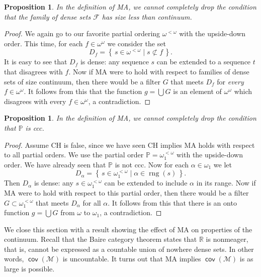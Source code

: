\documentclass[11pt,oneside,a4paper]{amsbook}
\newcommand{\set}[1]{\left\{\,#1\,\right\}}
\newcommand{\R}{\mathbb R}
\newcommand{\PP}{\mathbb P}
\newcommand{\Meager}{\mathcal M}
\DeclareMathOperator{\rng}{rng}
\DeclareMathOperator{\cov}{\mathsf{cov}}
\theoremstyle{definition}
\theoremstyle{plain}
\newtheorem{proposition}[theorem]{Proposition}
\theoremstyle{definition}
\theoremstyle{remark}
\numberwithin{equation}{section}
\numberwithin{figure}{section}
\begin{document}
\begin{proposition}
  In the definition of MA, we cannot completely drop the condition that the family of dense sets $\mathcal F$ has size less than continuum.
\end{proposition}

\begin{proof}
  We again go to our favorite partial ordering $\omega^{<\omega}$ with the upside-down order. This time, for each $f\in\omega^\omega$ we consider the set
  \[D_f=\set{s\in\omega^{<\omega}\mid s\not\subset f}\text{.}
  \]
  It is easy to see that $D_f$ is dense: any sequence $s$ can be extended to a sequence $t$ that disagrees with $f$. Now if MA were to hold with respect to families of dense sets of size continuum, then there would be a filter $G$ that meets $D_f$ for \emph{every} $f\in\omega^\omega$. It follows from this that the function $g=\bigcup G$ is an element of $\omega^\omega$ which disagrees with every $f\in\omega^\omega$, a contradiction.
\end{proof}

\begin{proposition}
  In the definition of MA, we cannot completely drop the condition that $\PP$ is ccc.
\end{proposition}

\begin{proof}
  Assume CH is false, since we have seen CH implies MA holds with respect to all partial orders. We use the partial order $\PP=\omega_1^{<\omega}$ with the upside-down order. We have already seen that $\PP$ is not ccc. Now for each $\alpha\in\omega_1$ we let
  \[D_\alpha=\set{s\in\omega_1^{<\omega}\mid\alpha\in\rng(s)}\text{.}
  \]
  Then $D_\alpha$ is dense: any $s\in\omega_1^{<\omega}$ can be extended to include $\alpha$ in its range. Now if MA were to hold with respect to this partial order, then there would be a filter $G\subset\omega_1^{<\omega}$ that meets $D_\alpha$ for all $\alpha$. It follows from this that there is an onto function $g=\bigcup G$ from $\omega$ to $\omega_1$, a contradiction.
\end{proof}

We close this section with a result showing the effect of MA on properties of the continuum. Recall that the Baire category theorem states that $\R$ is nonmeager, that is, cannot be expressed as a countable union of nowhere dense sets. In other words, $\cov(\Meager)$ is uncountable. It turns out that MA implies $\cov(\Meager)$ is as large is possible.
\end{document}
